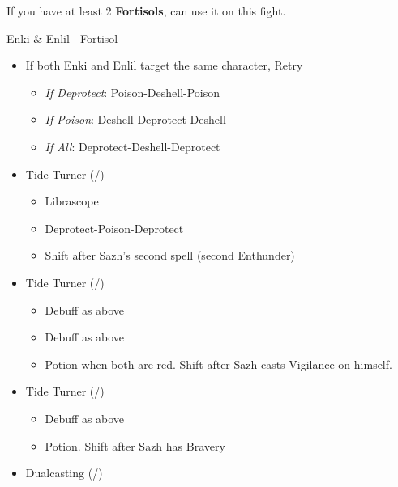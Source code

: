 \renewcommand{\first}{[1] Slash \& Burn (\rav/\com)}
\renewcommand{\second}{[2] Tide Turner (\sab/\syn)}
\renewcommand{\third}{[3] Tide Turner (\sab/\syn)}
\renewcommand{\fourth}{[4] Dualcasting (\rav/\rav)}
\renewcommand{\fifth}{[5] Undermine (\sab/\rav)}
\renewcommand{\sixth}{[6] Divide \& Conquer (\sab/\com)}
\newpage
If you have at least 2 \textbf{Fortisols}, can use it on this fight.
\begin{battle}{Enki \& Enlil $|$ Fortisol}
  \begin{multicols}{2}
    \begin{itemize}
      \item If both Enki and Enlil target the same character, Retry

            \begin{itemize}
              \item \textit{If Deprotect}: Poison-Deshell-Poison
              \item \textit{If Poison}: Deshell-Deprotect-Deshell
              \item \textit{If All}: Deprotect-Deshell-Deprotect
            \end{itemize}
      \item \second
            \begin{itemize}
              \item Librascope
              \item Deprotect-Poison-Deprotect
              \item Shift after Sazh's second spell (second Enthunder)
            \end{itemize}
      \item \third
            \begin{itemize}
              \item Debuff as above
              \item Debuff as above
              \item Potion when both are red. Shift after Sazh casts Vigilance on himself.
            \end{itemize}
      \item \second
            \begin{itemize}
              \item Debuff as above
              \item Potion. Shift after Sazh has Bravery
            \end{itemize}
      \item \fourth
            \begin{itemize}

\end{itemize}
\end{itemize}
\end{multicols}
\end{battle}

